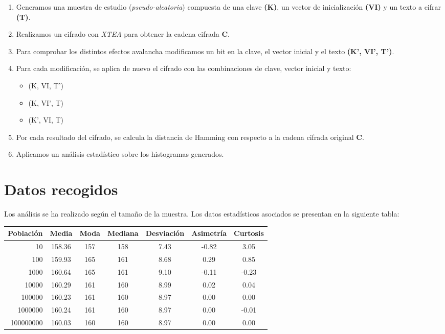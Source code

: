 \documentclass[11pt,a4paper]{article}
\begin{document}
\begin{enumerate}
\item Generamos una muestra de estudio (\emph{pseudo-aleatoria}) compuesta de una clave
  \textbf{(K)}, un vector de inicialización \textbf{(VI)} y un texto a
  cifrar \textbf{(T)}.
\item Realizamos un cifrado con \emph{XTEA} para obtener la cadena
  cifrada \textbf{C}.
\item Para comprobar los distintos efectos avalancha modificamos un
  bit en la clave, el vector inicial y el texto \textbf{(K', VI',
    T')}.
\item Para cada modificación, se aplica de nuevo el cifrado con las
  combinaciones de clave, vector inicial y texto:
  \begin{itemize}
  \item (K, VI, T')
  \item (K, VI', T)   
  \item (K', VI, T)
  \end{itemize}
\item Por cada resultado del cifrado, se calcula la distancia de
  Hamming con respecto a la cadena cifrada original \textbf{C}.
\item Aplicamos un análisis estadístico sobre los histogramas generados.
\end{enumerate}

\section{Datos recogidos}

Los análisis se ha realizado según el tamaño de la
muestra. Los datos estadísticos asociados se presentan en la siguiente
tabla:

\begin{center}
  \vspace{-15pt}
  \label{tab:medidas}
  \begin{tabular}[c]{| r | *{6}{c} |}
  \hline
  Población  & Media  & Moda & Mediana & Desviación & Asimetría & Curtosis \\ \hline
  10         & 158.36 & 157  & 158     & 7.43       & -0.82     & 3.05     \\
  100        & 159.93 & 165  & 161     & 8.68       & 0.29      & 0.85     \\
  1000       & 160.64 & 165  & 161     & 9.10       & -0.11     & -0.23    \\
  10000      & 160.29 & 161  & 160     & 8.99       & 0.02      & 0.04     \\
  100000     & 160.23 & 161  & 160     & 8.97       & 0.00      & 0.00     \\
  1000000    & 160.24 & 161  & 160     & 8.97       & 0.00      & -0.01    \\
  100000000  & 160.03 & 160  & 160     & 8.97       & 0.00      & 0.00     \\
  \hline
  \end{tabular}

\vspace{-10pt}
\end{center}
\end{document}
